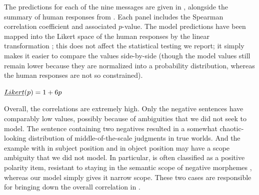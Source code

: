 \documentclass[leqno]{article}
\begin{document}
The predictions for each of the nine messages are given in
, alongside the summary of human responses
from . Each panel includes the Spearman
correlation coefficient and associated $p$-value. The model
predictions have been mapped into the Likert space of the human
responses by the linear transformation ; this does not
affect the statistical testing we report; it simply makes it easier to
compare the values side-by-side (though the model values still remain
lower because they are normalized into a probability distribution,
whereas the human responses are not so constrained).
%
\begin{examples}
\item\label{likert} $\emph{Likert}(p) = 1 + 6p$
\end{examples}


Overall, the correlations are extremely high. Only the negative
sentences have comparably low values, possibly because of ambiguities
that we did not seek to model. The sentence containing two negatives
resulted in a somewhat chaotic-looking distribution of
middle-of-the-scale judgments in true worlds. And the example with
 in subject position and  in object position may
have a scope ambiguity that we did not model. In particular,
 is often classified as a positive polarity item, resistant
to staying in the semantic scope of negative morphemes
\citep{Baker70,Israel96}, whereas our model simply gives it narrow
scope.  These two cases are responsible for bringing down the overall
correlation in .
\end{document}
